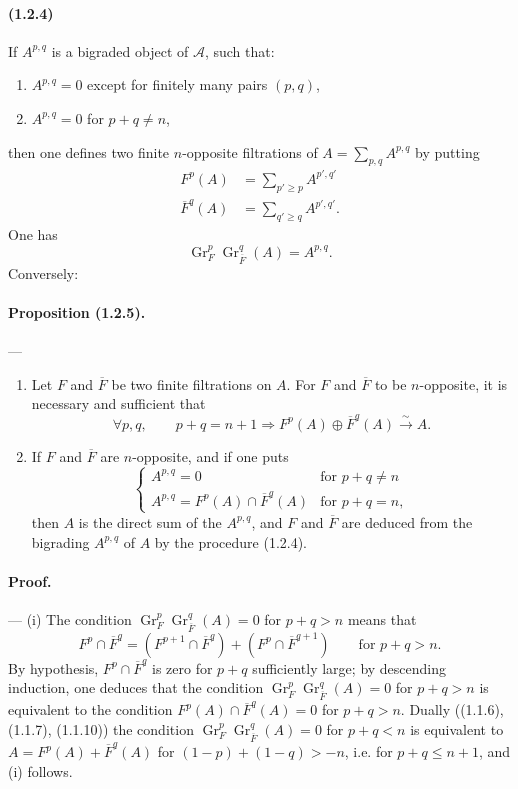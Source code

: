 \documentclass[10pt]{article}
\newcommand{\Gr}{\operatorname{Gr}}
\newcommand{\calA}{\mathcal A}
\newcommand{\iso}{\xrightarrow{\sim}}
\begin{document}
\paragraph{(1.2.4)} If $A^{p,q}$ is a bigraded object of $\calA$, such that:
\begin{enumerate}[label=\alph*)]
\item $A^{p,q}=0$ except for finitely many pairs $(p,q)$,
\item $A^{p,q}=0$ for $p+q\ne n$,
\end{enumerate}
then one defines two finite $n$-opposite filtrations of $A=\sum_{p,q}A^{p,q}$ by putting
\begin{align}
F^p(A)&=\sum_{p'\ge p} A^{p',q'} \tag{1.2.4.1}\\
\overline F^q(A)&=\sum_{q'\ge q} A^{p',q'}. \tag{1.2.4.2}
\end{align}
One has
\[
\tag{1.2.4.3}
\Gr_F^p\Gr_{\overline F}^{q}(A)=A^{p,q}.
\]
Conversely:

\paragraph{Proposition (1.2.5).} --- \begin{enumerate}[label=(\roman*)]
\item Let $F$ and $\overline F$ be two finite filtrations on $A$. For $F$ and $\overline F$ to be $n$-opposite, it is necessary and sufficient that
\[
\forall p,q,\qquad p+q=n+1\Rightarrow F^p(A)\oplus\overline F^q(A)\iso A.
\]
\item If $F$ and $\overline F$ are $n$-opposite, and if one puts
\[
\begin{cases}
A^{p,q}=0 & \text{for }p+q\ne n\\
A^{p,q}=F^p(A)\cap\overline F^q(A) & \text{for }p+q=n,
\end{cases}
\]
then $A$ is the direct sum of the $A^{p,q}$, and $F$ and $\overline F$ are deduced from the bigrading $A^{p,q}$ of $A$ by the procedure (1.2.4).
\end{enumerate}

\paragraph{Proof.} --- (i) The condition $\Gr_F^p\Gr_{\overline F}^q(A)=0$ for $p+q>n$ means that
\[
F^p\cap\overline F^q=(F^{p+1}\cap\overline F^q)+(F^p\cap\overline F^{q+1})\qquad\text{for }p+q>n.
\]
By hypothesis, $F^p\cap\overline F^q$ is zero for $p+q$ sufficiently large; by descending induction, one deduces that the condition $\Gr_F^p\Gr_{\overline F}^q(A)=0$ for $p+q>n$ is equivalent to the condition $F^p(A)\cap\overline F^q(A)=0$ for $p+q>n$. Dually ((1.1.6), (1.1.7), (1.1.10)) the condition $\Gr_F^p\Gr_{\overline F}^q(A)=0$ for $p+q<n$ is equivalent to $A=F^p(A)+\overline F^q(A)$ for $(1-p)+(1-q)>-n$, i.e. for $p+q\le n+1$, and (i) follows.
\end{document}
